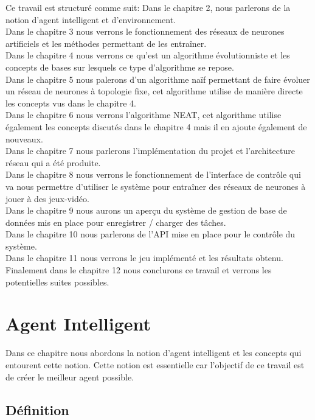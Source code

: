 \documentclass{article}
\begin{document}
Ce travail est structuré comme suit: Dans le chapitre 2, nous parlerons de la notion d'agent intelligent et d'environnement.\\
Dans le chapitre 3 nous verrons le fonctionnement des réseaux de neurones artificiels et les méthodes permettant de les entraîner.\\
Dans le chapitre 4 nous verrons ce qu'est un algorithme évolutionniste et les concepts de bases sur lesquels ce type d'algorithme se repose.\\
Dans le chapitre 5 nous palerons d'un algorithme naïf permettant de faire évoluer un réseau de neurones à topologie fixe, cet algorithme utilise de manière directe les concepts vus dans le chapitre 4.\\
Dans le chapitre 6 nous verrons l'algorithme NEAT, cet algorithme utilise également les concepts discutés dans le chapitre 4 mais il en ajoute également de nouveaux.\\
Dans le chapitre 7 nous parlerons l'implémentation du projet et l'architecture réseau qui a été produite.\\
Dans le chapitre 8 nous verrons le fonctionnement de l'interface de contrôle qui va nous permettre d'utiliser le système pour entraîner des réseaux de neurones à jouer à des jeux-vidéo.\\
Dans le chapitre 9 nous aurons un aperçu du système de gestion de base de données mis en place pour enregistrer / charger des tâches.\\
Dans le chapitre 10 nous parlerons de l'API mise en place pour le contrôle du système.\\
Dans le chapitre 11 nous verrons le jeu implémenté et les résultats obtenu.\\
Finalement dans le chapitre 12 nous conclurons ce travail et verrons les potentielles suites possibles.
\newpage

\section{Agent Intelligent}

Dans ce chapitre nous abordons la notion d'agent intelligent et les concepts qui entourent cette notion. Cette notion est essentielle car l'objectif de ce travail est de créer le meilleur agent possible.

\subsection{Définition}
\end{document}
